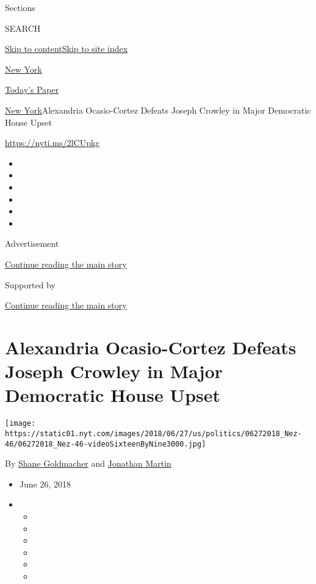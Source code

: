 Sections

SEARCH

\protect\hyperlink{site-content}{Skip to
content}\protect\hyperlink{site-index}{Skip to site index}

\href{https://www.nytimes.com/section/nyregion}{New York}

\href{https://myaccount.nytimes.com/auth/login?response_type=cookie\&client_id=vi}{}

\href{https://www.nytimes.com/section/todayspaper}{Today's Paper}

\href{/section/nyregion}{New York}\textbar{}Alexandria Ocasio-Cortez
Defeats Joseph Crowley in Major Democratic House Upset

\url{https://nyti.ms/2lCUpkg}

\begin{itemize}
\item
\item
\item
\item
\item
\item
\end{itemize}

Advertisement

\protect\hyperlink{after-top}{Continue reading the main story}

Supported by

\protect\hyperlink{after-sponsor}{Continue reading the main story}

\hypertarget{alexandria-ocasio-cortez-defeats-joseph-crowley-in-major-democratic-house-upset}{%
\section{Alexandria Ocasio-Cortez Defeats Joseph Crowley in Major
Democratic House
Upset}\label{alexandria-ocasio-cortez-defeats-joseph-crowley-in-major-democratic-house-upset}}

\texttt{[image: https://static01.nyt.com/images/2018/06/27/us/politics/06272018\_Nez-46/06272018\_Nez-46-videoSixteenByNine3000.jpg]}

By \href{https://www.nytimes.com/by/shane-goldmacher}{Shane Goldmacher}
and \href{https://www.nytimes.com/by/jonathan-martin}{Jonathan Martin}

\begin{itemize}
\item
  June 26, 2018
\item
  \begin{itemize}
  \item
  \item
  \item
  \item
  \item
  \item
  \end{itemize}
\end{itemize}

